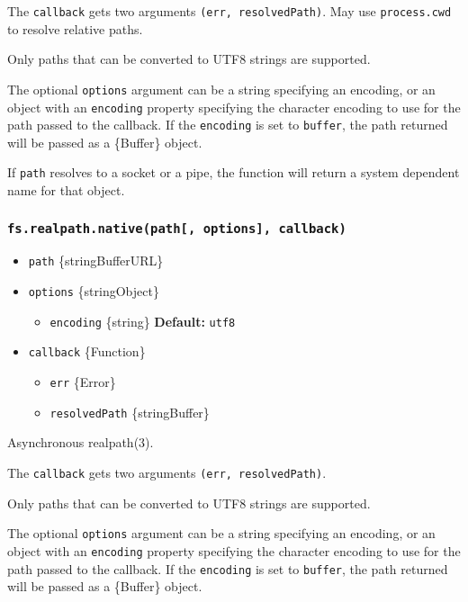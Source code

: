 The \texttt{callback} gets two arguments \texttt{(err,\ resolvedPath)}.
May use \texttt{process.cwd} to resolve relative paths.

Only paths that can be converted to UTF8 strings are supported.

The optional \texttt{options} argument can be a string specifying an
encoding, or an object with an \texttt{encoding} property specifying the
character encoding to use for the path passed to the callback. If the
\texttt{encoding} is set to
\texttt{\textquotesingle{}buffer\textquotesingle{}}, the path returned
will be passed as a \{Buffer\} object.

If \texttt{path} resolves to a socket or a pipe, the function will
return a system dependent name for that object.

\subsubsection{\texorpdfstring{\texttt{fs.realpath.native(path{[},\ options{]},\ callback)}}{fs.realpath.native(path{[}, options{]}, callback)}}\label{fs.realpath.nativepath-options-callback}

\begin{itemize}
\tightlist
\item
  \texttt{path} \{string\textbar Buffer\textbar URL\}
\item
  \texttt{options} \{string\textbar Object\}

  \begin{itemize}
  \tightlist
  \item
    \texttt{encoding} \{string\} \textbf{Default:}
    \texttt{\textquotesingle{}utf8\textquotesingle{}}
  \end{itemize}
\item
  \texttt{callback} \{Function\}

  \begin{itemize}
  \tightlist
  \item
    \texttt{err} \{Error\}
  \item
    \texttt{resolvedPath} \{string\textbar Buffer\}
  \end{itemize}
\end{itemize}

Asynchronous realpath(3).

The \texttt{callback} gets two arguments \texttt{(err,\ resolvedPath)}.

Only paths that can be converted to UTF8 strings are supported.

The optional \texttt{options} argument can be a string specifying an
encoding, or an object with an \texttt{encoding} property specifying the
character encoding to use for the path passed to the callback. If the
\texttt{encoding} is set to
\texttt{\textquotesingle{}buffer\textquotesingle{}}, the path returned
will be passed as a \{Buffer\} object.

